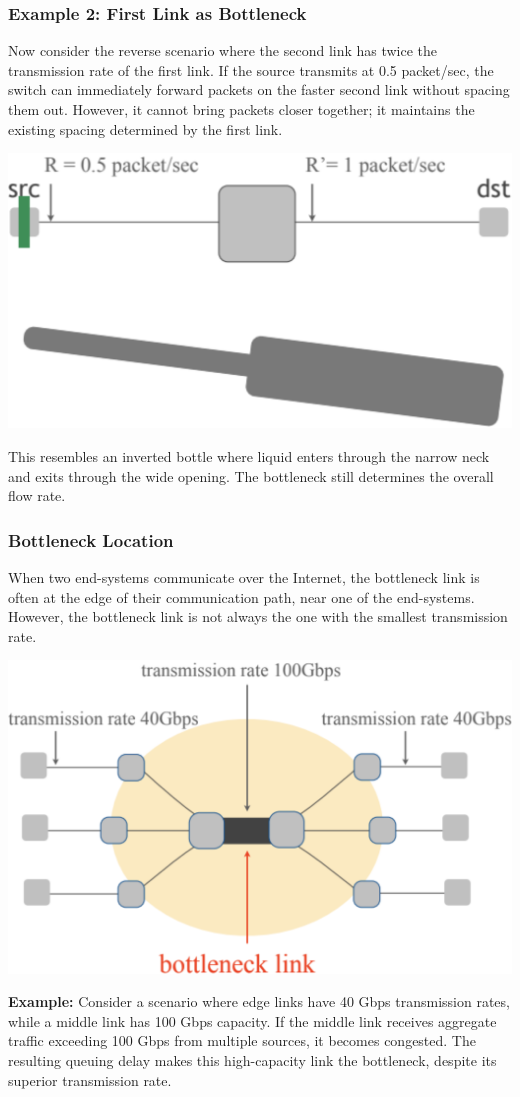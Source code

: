 \documentclass[../../compsys.tex]{subfiles}
\begin{document}
\subsubsection{Example 2: First Link as Bottleneck}
Now consider the reverse scenario where the second link has twice the transmission rate of the first link. If the source transmits at 0.5 packet/sec, the switch can immediately forward packets on the faster second link without spacing them out. However, it cannot bring packets closer together; it maintains the existing spacing determined by the first link.
\begin{center}
  \includegraphics[width=.55\textwidth]{images/bottleneck_example2.png}
\end{center}
This resembles an inverted bottle where liquid enters through the narrow neck and exits through the wide opening. The bottleneck still determines the overall flow rate.

\subsubsection{Bottleneck Location}
When two end-systems communicate over the Internet, the bottleneck link is often at the edge of their communication path, near one of the end-systems. However, the bottleneck link is not always the one with the smallest transmission rate.

\begin{center}
  \includegraphics[width=.55\textwidth]{images/bottleneck.png}
\end{center}

\textbf{Example:} Consider a scenario where edge links have 40 Gbps transmission rates, while a middle link has 100 Gbps capacity. If the middle link receives aggregate traffic exceeding 100 Gbps from multiple sources, it becomes congested. The resulting queuing delay makes this high-capacity link the bottleneck, despite its superior transmission rate.
\end{document}
